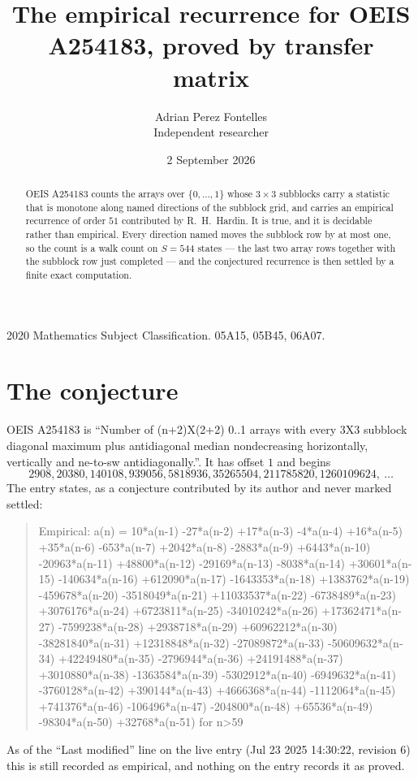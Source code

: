 \documentclass[11pt,a4paper]{article}
\title{The empirical recurrence for OEIS A254183, proved by transfer matrix}
\author{Adrian Perez Fontelles\\ \small Independent researcher}
\date{2 September 2026}
\theoremstyle{plain}
\theoremstyle{definition}
\begin{document}
\maketitle

\begin{abstract}
OEIS A254183 counts the arrays over $\{0,\dots,1\}$ whose $3\times3$ subblocks carry a
statistic that is monotone along named directions of the subblock grid, and carries an
empirical recurrence of order $51$ contributed by R.~H.~Hardin. It is true, and it is
decidable rather than empirical. Every direction named moves the subblock row by at most one,
so the count is a walk count on $S=544$ states --- the last two array rows together with the
subblock row just completed --- and the conjectured recurrence is then settled by a finite
exact computation.
\end{abstract}

\noindent\small 2020 Mathematics Subject Classification. 05A15, 05B45, 06A07.\normalsize

\section{The conjecture}

OEIS A254183 is ``Number of (n+2)X(2+2) 0..1 arrays with every 3X3 subblock diagonal maximum plus antidiagonal median nondecreasing horizontally, vertically and ne-to-sw antidiagonally.''. It has offset $1$ and begins
\[
2908, 20380, 140108, 939056, 5818936, 35265504, 211785820, 1260109624,\ \dots
\]
The entry states, as a conjecture contributed by its author and never marked settled:
\begin{quote}
Empirical: a(n) = 10*a(n-1) -27*a(n-2) +17*a(n-3) -4*a(n-4) +16*a(n-5) +35*a(n-6) -653*a(n-7) +2042*a(n-8) -2883*a(n-9) +6443*a(n-10) -20963*a(n-11) +48800*a(n-12) -29169*a(n-13) -8038*a(n-14) +30601*a(n-15) -140634*a(n-16) +612090*a(n-17) -1643353*a(n-18) +1383762*a(n-19) -459678*a(n-20) -3518049*a(n-21) +11033537*a(n-22) -6738489*a(n-23) +3076176*a(n-24) +6723811*a(n-25) -34010242*a(n-26) +17362471*a(n-27) -7599238*a(n-28) +2938718*a(n-29) +60962212*a(n-30) -38281840*a(n-31) +12318848*a(n-32) -27089872*a(n-33) -50609632*a(n-34) +42249480*a(n-35) -2796944*a(n-36) +24191488*a(n-37) +3010880*a(n-38) -1363584*a(n-39) -5302912*a(n-40) -6949632*a(n-41) -3760128*a(n-42) +390144*a(n-43) +4666368*a(n-44) -1112064*a(n-45) +741376*a(n-46) -106496*a(n-47) -204800*a(n-48) +65536*a(n-49) -98304*a(n-50) +32768*a(n-51) for n>59
\end{quote}
As of the ``Last modified'' line on the live entry (Jul 23 2025 14:30:22, revision 6) this is still
recorded as empirical, and nothing on the entry records it as proved.
\end{document}
